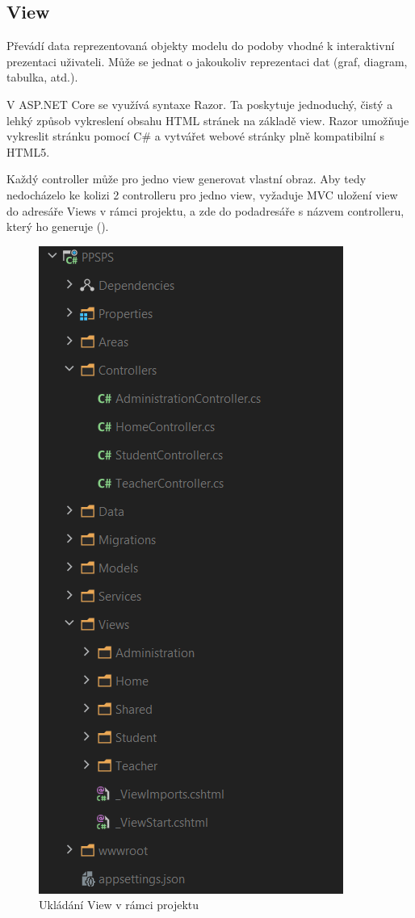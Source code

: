 \documentclass[a4paper, 12pt]{report}
\begin{document}
			\subsection{View}
			Převádí data reprezentovaná objekty modelu do podoby vhodné k interaktivní prezentaci uživateli.\cite{MVC_Wiki_CZ} Může se jednat o jakoukoliv reprezentaci dat (graf, diagram, tabulka, atd.).\par
			V ASP.NET Core se využívá syntaxe Razor. Ta poskytuje jednoduchý, čistý a lehký způsob vykreslení obsahu HTML stránek na základě view. Razor umožňuje vykreslit stránku pomocí C\# a vytvářet webové stránky plně kompatibilní s HTML5.\cite{MVC_Wiki_EN}\par
			Každý controller může pro jedno view generovat vlastní obraz. Aby tedy nedocházelo ke kolizi 2 controlleru pro jedno view, vyžaduje  MVC uložení view do adresáře Views v rámci projektu, a zde do podadresáře s názvem controlleru, který ho generuje ().
				\begin{figure}[H]
					\centering
					\includegraphics[scale=0.7]{ViewsController}
					\caption{Ukládání View v rámci projektu}
					\label{ViewsController}
				\end{figure}
\end{document}
